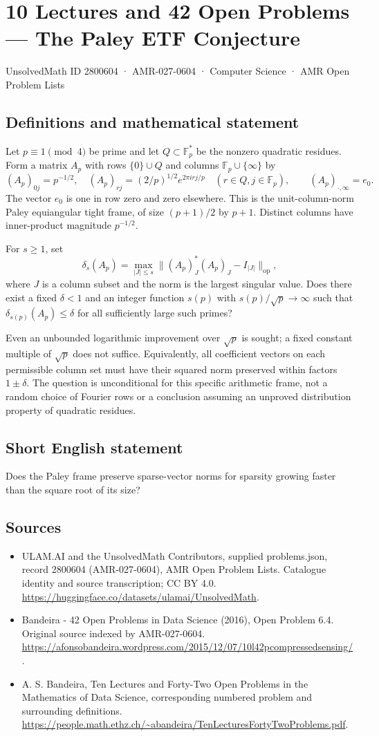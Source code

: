 \documentclass[11pt,a4paper]{article}
\begin{document}
\section*{10 Lectures and 42 Open Problems — The Paley ETF Conjecture}\label{2800604}
{\small UnsolvedMath ID 2800604 · AMR-027-0604 · Computer Science · AMR Open Problem Lists}
\subsection{Definitions and mathematical statement}
Let $p\equiv1\pmod4$ be prime and let $Q\subset\mathbb F_p^*$ be
the nonzero quadratic residues. Form a matrix $A_p$ with rows
$\{0\}\cup Q$ and columns $\mathbb F_p\cup\{\infty\}$ by
\[
 (A_p)_{0j}=p^{-1/2},\quad
 (A_p)_{rj}=(2/p)^{1/2}e^{2\pi i rj/p}\quad(r\in Q,j\in\mathbb F_p),
 \qquad (A_p)_{\cdot,\infty}=e_0.
\]
The vector $e_0$ is one in row zero and zero elsewhere. This is the
unit-column-norm Paley equiangular tight frame, of size
$(p+1)/2$ by $p+1$. Distinct columns have inner-product magnitude
$p^{-1/2}$.

For $s\ge1$, set
\[
 \delta_s(A_p)=\max_{|J|\le s}
                 \|(A_p)_J^*(A_p)_J-I_{|J|}\|_{\mathrm{op}},
\]
where $J$ is a column subset and the norm is the largest singular
value. Does there exist a fixed $\delta<1$ and an integer function
$s(p)$ with $s(p)/\sqrt p\to\infty$ such that
$\delta_{s(p)}(A_p)\le\delta$ for all sufficiently large such primes?

Even an unbounded logarithmic improvement over $\sqrt p$ is sought;
a fixed constant multiple of $\sqrt p$ does not suffice. Equivalently,
all coefficient vectors on each permissible column set must have their
squared norm preserved within factors $1\pm\delta$. The question is
unconditional for this specific arithmetic frame, not a random choice
of Fourier rows or a conclusion assuming an unproved distribution
property of quadratic residues.
\subsection{Short English statement}
Does the Paley frame preserve sparse-vector norms for sparsity growing faster than the square root of its size?
\subsection{Sources}
\begin{itemize}
\item[S1] ULAM.AI and the UnsolvedMath Contributors, supplied problems.json, record 2800604 (AMR-027-0604), AMR Open Problem Lists. Catalogue identity and source transcription; CC BY 4.0.
\url{https://huggingface.co/datasets/ulamai/UnsolvedMath}.
\item[S2] Bandeira - 42 Open Problems in Data Science (2016), Open Problem 6.4. Original source indexed by AMR-027-0604.
\url{https://afonsobandeira.wordpress.com/2015/12/07/10l42pcompressedsensing/}.
\item[S3] A. S. Bandeira, Ten Lectures and Forty-Two Open Problems in the Mathematics of Data Science, corresponding numbered problem and surrounding definitions.
\url{https://people.math.ethz.ch/~abandeira/TenLecturesFortyTwoProblems.pdf}.
\end{itemize}
\end{document}

